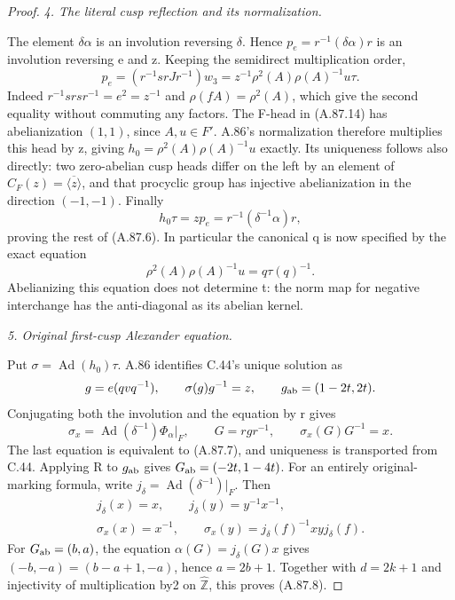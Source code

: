 \begin{proof}
\emph{4. The literal cusp reflection and its normalization.}\par
The element \(\delta\alpha\) is an involution reversing \(\delta\).
Hence \(p_e=r^{-1}(\delta\alpha)r\) is an involution reversing e and z.
Keeping the semidirect multiplication order,
\[
 p_e=(r^{-1}srJr^{-1})w_3
     =z^{-1}\rho^2(A)\rho(A)^{-1}u\tau.
 \tag{A.87.14}
\]
Indeed \(r^{-1}srsr^{-1}=e^2=z^{-1}\) and
\(\rho(fA)=\rho^2(A)\), which give the second equality without
commuting any factors. The F-head in (A.87.14) has abelianization
\((1,1)\), since \(A,u\in F'\). A.86's normalization therefore
multiplies this head by z, giving
\(h_0=\rho^2(A)\rho(A)^{-1}u\) exactly. Its uniqueness follows
also directly: two zero-abelian cusp heads differ on the left by
an element of \(C_F(z)=\overline{\langle z\rangle}\), and that
procyclic group has injective abelianization in the direction
\((-1,-1)\). Finally
\[
 h_0\tau=z p_e=r^{-1}(\delta^{-1}\alpha)r,
\]
proving the rest of (A.87.6). In particular the canonical q is now
specified by the exact equation
\[
                 \rho^2(A)\rho(A)^{-1}u=q\tau(q)^{-1}.
 \tag{A.87.15}
\]
Abelianizing this equation does not determine t: the norm map for
negative interchange has the anti-diagonal as its abelian kernel.

\emph{5. Original first-cusp Alexander equation.}\par
Put \(\sigma=\operatorname{Ad}(h_0)\tau\). A.86 identifies C.44's
unique solution as
\[
 g=e(qvq^{-1}),\qquad \sigma(g)g^{-1}=z,
 \qquad g_{\rm ab}=(1-2t,2t).
\]
Conjugating both the involution and the equation by r gives
\[
 \sigma_x=\operatorname{Ad}(\delta^{-1})\Phi_\alpha|_F,
 \qquad G=rgr^{-1},\qquad \sigma_x(G)G^{-1}=x.
\]
The last equation is equivalent to (A.87.7), and uniqueness is
transported from C.44. Applying R to \(g_{\rm ab}\) gives
\(G_{\rm ab}=(-2t,1-4t)\). For an entirely original-marking formula,
write \(j_\delta=\operatorname{Ad}(\delta^{-1})|_F\). Then
\[
 \begin{gathered}
 j_\delta(x)=x,\qquad j_\delta(y)=y^{-1}x^{-1},\\
 \sigma_x(x)=x^{-1},\qquad
 \sigma_x(y)=j_\delta(f)^{-1}xyj_\delta(f).
 \end{gathered}
 \tag{A.87.16}
\]
For \(G_{\rm ab}=(b,a)\), the equation
\(\alpha(G)=j_\delta(G)x\) gives
\((-b,-a)=(b-a+1,-a)\), hence \(a=2b+1\).
Together with \(d=2k+1\) and injectivity of multiplication by2 on
\(\widehat{\mathbb Z}\), this proves (A.87.8).


\end{proof}
